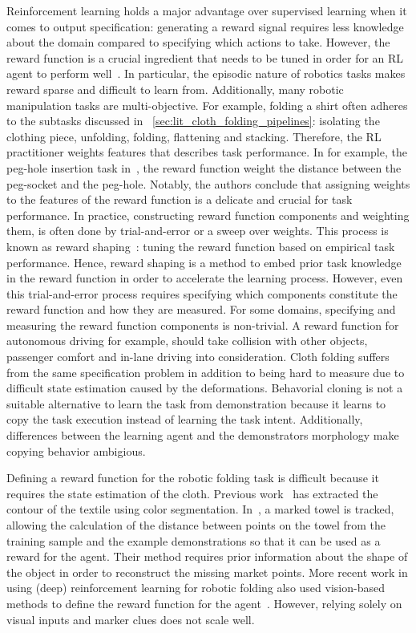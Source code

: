 \documentclass[\home/main.tex]{subfiles}
\begin{document}
Reinforcement learning holds a major advantage over supervised learning when it comes to output specification: generating a reward signal requires less knowledge about the domain compared to specifying which actions to take. However, the reward function is a crucial ingredient that needs to be tuned in order for an RL agent to perform well~\autocite{Sutton2018}. In particular, the episodic nature of robotics tasks makes reward sparse and difficult to learn from. Additionally, many robotic manipulation tasks are multi-objective. For example, folding a shirt often adheres to the subtasks discussed in ~\cref{sec:lit_cloth_folding_pipelines}: isolating the clothing piece, unfolding, folding, flattening and stacking. Therefore, the RL practitioner weights features that describes task performance. In for example, the peg-hole insertion task in~\autocite{vecerik2018leveraging}, the reward function weight the distance between the peg-socket and the peg-hole. Notably, the authors conclude that assigning weights to the features of the reward function is a delicate and crucial for task performance. In practice, constructing reward function components and weighting them, is often done by trial-and-error or a sweep over weights. This process is known as reward shaping~\autocite{laud2004theory}: tuning the reward function based on empirical task performance. Hence, reward shaping is a method to embed prior task knowledge in the reward function in order to accelerate the learning process. However, even this trial-and-error process requires specifying which components constitute the reward function and how they are measured. For some domains, specifying and measuring the reward function components is non-trivial. A reward function for autonomous driving for example, should take collision with other objects, passenger comfort and in-lane driving into consideration. Cloth folding suffers from the same specification problem in addition to being hard to measure due to difficult state estimation caused by the deformations. Behavorial cloning is not a suitable alternative to learn the task from demonstration because it learns to copy the task execution instead of learning the task intent. Additionally, differences between the learning agent and the demonstrators morphology make copying behavior ambigious. 

Defining a reward function for the robotic folding task is difficult because it requires the state estimation of the cloth. Previous work~\autocite{Doumanoglou2016,Miller2012} has extracted the contour of the textile using color segmentation. In~\autocite{Balaguer2011}, a marked towel is tracked, allowing the calculation of the distance between points on the towel from the training sample and the example demonstrations so that it can be used as a reward for the agent. Their method requires prior information about the shape of the object in order to reconstruct the missing market points. More recent work in using (deep) reinforcement learning for robotic folding also used vision-based methods to define the reward function for the agent~\autocite{Tsurumine2019, Matas2018}. However, relying solely on visual inputs and marker clues does not scale well. 
\end{document}
